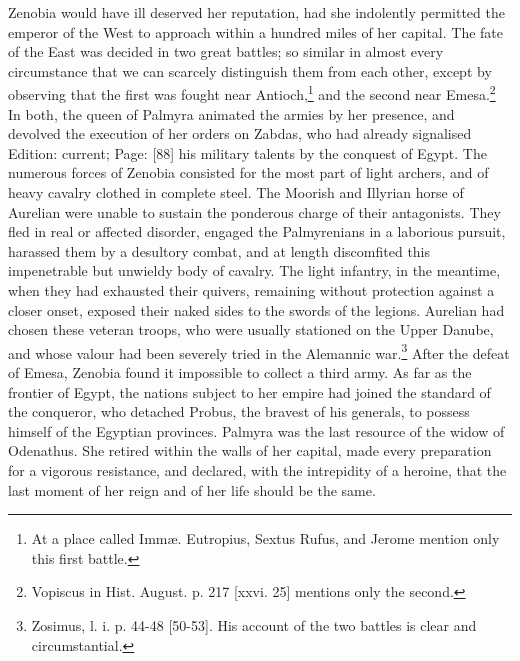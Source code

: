 Zenobia would have ill deserved her reputation, had she indolently permitted the emperor of the West to approach within a hundred miles of her capital. The fate of the East was decided in two great battles; so similar in almost every circumstance that we can scarcely distinguish them from each other, except by observing that the first was fought near Antioch,\footnote{At a place called Immæ. Eutropius, Sextus Rufus, and Jerome mention only this first battle.} and the second near Emesa.\footnote{Vopiscus in Hist. August. p. 217 [xxvi. 25] mentions only the second.} In both, the queen of Palmyra animated the armies by her presence, and devolved the execution of her orders on Zabdas, who had already signalised Edition: current; Page: [88] his military talents by the conquest of Egypt. The numerous forces of Zenobia consisted for the most part of light archers, and of heavy cavalry clothed in complete steel. The Moorish and Illyrian horse of Aurelian were unable to sustain the ponderous charge of their antagonists. They fled in real or affected disorder, engaged the Palmyrenians in a laborious pursuit, harassed them by a desultory combat, and at length discomfited this impenetrable but unwieldy body of cavalry. The light infantry, in the meantime, when they had exhausted their quivers, remaining without protection against a closer onset, exposed their naked sides to the swords of the legions. Aurelian had chosen these veteran troops, who were usually stationed on the Upper Danube, and whose valour had been severely tried in the Alemannic war.\footnote{Zosimus, l. i. p. 44-48 [50-53]. His account of the two battles is clear and circumstantial.} After the defeat of Emesa, Zenobia found it impossible to collect a third army. As far as the frontier of Egypt, the nations subject to her empire had joined the standard of the conqueror, who detached Probus, the bravest of his generals, to possess himself of the Egyptian provinces. Palmyra was the last resource of the widow of Odenathus. She retired within the walls of her capital, made every preparation for a vigorous resistance, and declared, with the intrepidity of a heroine, that the last moment of her reign and of her life should be the same.

